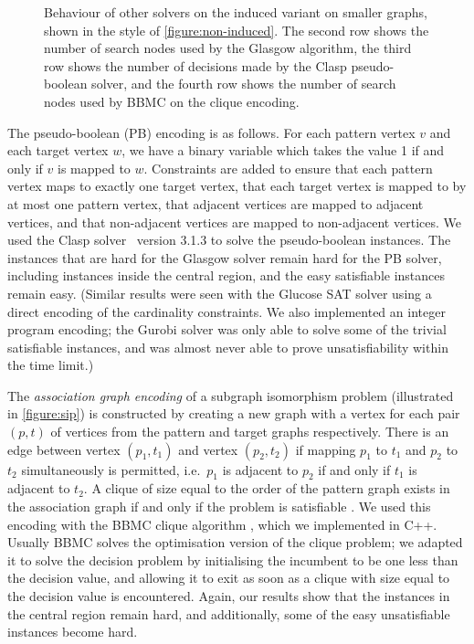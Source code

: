 \documentclass[letterpaper]{article}
\newcommand{\citep}[1]{\cite{#1}}
\begin{document}
\begin{figure*}[t]
    
    \caption{Behaviour of other solvers on the induced variant on smaller graphs, shown in the style of
        \cref{figure:non-induced}. The second row shows the number of search nodes used by the
    Glasgow algorithm, the third row shows the number of decisions made by the Clasp pseudo-boolean
solver, and the fourth row shows the number of search nodes used by BBMC on the clique
encoding.}\label{figure:alt}
\end{figure*}

The pseudo-boolean (PB) encoding is as follows. For each pattern vertex $v$ and each target vertex
$w$, we have a binary variable which takes the value 1 if and only if $v$ is mapped to $w$.
Constraints are added to ensure that each pattern vertex maps to exactly one target vertex, that
each target vertex is mapped to by at most one pattern vertex, that adjacent vertices are mapped to
adjacent vertices, and that non-adjacent vertices are mapped to non-adjacent vertices. We used the
Clasp solver~\citep{gekakaosscsc11a} version 3.1.3 to solve the pseudo-boolean instances.  The
instances that are hard for the Glasgow solver remain hard for the PB solver, including instances
inside the central region, and the easy satisfiable instances remain easy. (Similar results were
seen with the Glucose SAT solver using a direct encoding of the cardinality constraints. We also
implemented an integer program encoding; the Gurobi solver was only able to solve some of the
trivial satisfiable instances, and was almost never able to prove unsatisfiability within the time
limit.)

The \emph{association graph encoding} of a subgraph isomorphism problem (illustrated in
\cref{figure:sip}) is constructed by creating a new graph with a vertex for each pair $(p, t)$ of
vertices from the pattern and target graphs respectively. There is an edge between vertex $(p_1,
t_1)$ and vertex $(p_2, t_2)$ if mapping $p_1$ to $t_1$ and $p_2$ to $t_2$ simultaneously is
permitted, i.e.\ $p_1$ is adjacent to $p_2$ if and only if $t_1$ is adjacent to $t_2$. A clique of
size equal to the order of the pattern graph exists in the association graph if and only if the
problem is satisfiable \citep{Levi:1973}. We used this encoding with the BBMC clique algorithm
\citep{SanSegundo:2011}, which we implemented in C++. Usually BBMC solves the optimisation version
of the clique problem; we adapted it to solve the decision problem by initialising the incumbent to
be one less than the decision value, and allowing it to exit as soon as a clique with size equal to
the decision value is encountered.  Again, our results show that the instances in the central region
remain hard, and additionally, some of the easy unsatisfiable instances become hard.
\end{document}
